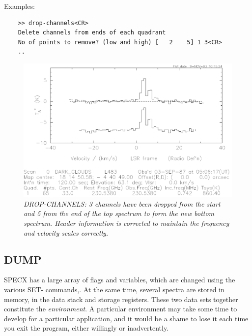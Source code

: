 \documentclass[11pt,twoside]{report}
\begin{document}
Examples:
\begin{verbatim}
    >> drop-channels<CR>
    Delete channels from ends of each quadrant
    No of points to remove? (low and high) [   2    5] 1 3<CR>
    ..
\end{verbatim}

\begin{figure}[htbp]
\begin{center}
\includegraphics[scale=0.65]{drop-ch}
\protect\parbox{5.5in}
{\caption[DROP]
{\sl
DROP-CHANNELS: 3 channels have been dropped from the start and 5 from the
end of the top spectrum to form the new bottom spectrum. Header information
is corrected to maintain the frequency and velocity scales correctly.
\label{DROP}
}
}
\end{center}
\end{figure}

\subsection{DUMP} 

SPECX has a large array of flags  and variables, which are changed
using the various SET- commands,. At the same time, several spectra are stored
in memory, in the data stack  and storage registers.
 These two data sets together constitute
the {\em environment}.  A particular environment may take
some time to develop for a particular application, and it would be a shame to
lose it each time you exit the program, either willingly or inadvertently.
\end{document}
